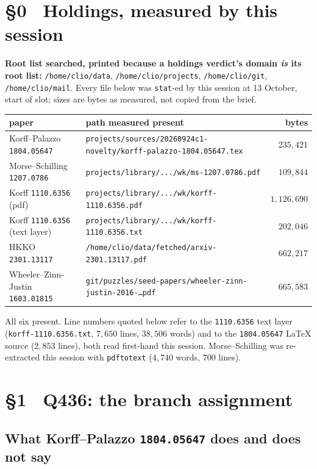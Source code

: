 \documentclass[11pt]{article}
\theoremstyle{plain}
\theoremstyle{definition}
\begin{document}
\section*{\S0 \ Holdings, measured by this session}

\textbf{Root list searched, printed because a holdings verdict's domain \emph{is} its root
list:} \texttt{/home/clio/data}, \texttt{/home/clio/projects}, \texttt{/home/clio/git},
\texttt{/home/clio/mail}. Every file below was \texttt{stat}-ed by this session at
13 October, start of slot; sizes are bytes as measured, not copied from the brief.

\begin{center}\small
\begin{tabular}{@{}llr@{}}
\toprule
paper & path measured present & bytes \\
\midrule
Korff--Palazzo \texttt{1804.05647} & \texttt{projects/sources/20260924c1-novelty/korff-palazzo-1804.05647.tex} & $235{,}421$ \\
Morse--Schilling \texttt{1207.0786} & \texttt{projects/library/.../wk/ms-1207.0786.pdf} & $109{,}844$ \\
Korff \texttt{1110.6356} (pdf) & \texttt{projects/library/.../wk/korff-1110.6356.pdf} & $1{,}126{,}690$ \\
Korff \texttt{1110.6356} (text layer) & \texttt{projects/library/.../wk/korff-1110.6356.txt} & $202{,}046$ \\
HKKO \texttt{2301.13117} & \texttt{/home/clio/data/fetched/arxiv-2301.13117.pdf} & $662{,}217$ \\
Wheeler--Zinn-Justin \texttt{1603.01815} & \texttt{git/puzzles/seed-papers/wheeler-zinn-justin-2016-\dots pdf} & $665{,}583$ \\
\bottomrule
\end{tabular}
\end{center}

All six present. Line numbers quoted below refer to the \texttt{1110.6356} text layer
(\texttt{korff-1110.6356.txt}, $7{,}650$ lines, $38{,}506$ words) and to the
\texttt{1804.05647} \LaTeX{} source ($2{,}853$ lines), both read first-hand this session.
Morse--Schilling was re-extracted this session with \texttt{pdftotext}
($4{,}740$ words, $700$ lines).

\section{\S1 \ Q436: the branch assignment}

\subsection{What Korff--Palazzo \texttt{1804.05647} does and does not say}
\end{document}
